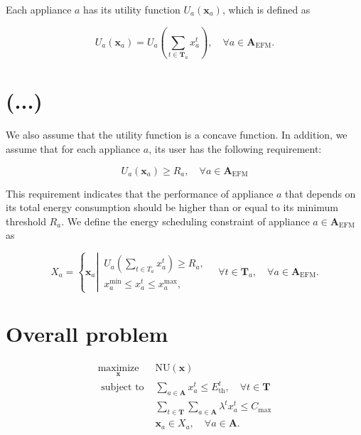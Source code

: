 \documentclass[10pt]{article}
\begin{document}
Each appliance $a$ has its utility function $U_{a}\left(\boldsymbol{x}_{a}\right)$, which is defined as


\begin{equation*}
U_{a}\left(\boldsymbol{x}_{a}\right)=U_{a}\left(\sum_{t \in \boldsymbol{T}_{a}} x_{a}^{t}\right), \quad \forall a \in \boldsymbol{A}_{\mathrm{EFM}} . \tag{11}
\end{equation*}


\section*{(...)}
We also assume that the utility function is a concave function. In addition, we assume that for each appliance $a$, its user has the following requirement:


\begin{equation*}
U_{a}\left(\boldsymbol{x}_{a}\right) \geq R_{a}, \quad \forall a \in \boldsymbol{A}_{\mathrm{EFM}} \tag{12}
\end{equation*}


This requirement indicates that the performance of appliance $a$ that depends on its total energy consumption should be higher than or equal to its minimum threshold $R_{a}$. We define the energy scheduling constraint of appliance $a \in \boldsymbol{A}_{\mathrm{EFM}}$ as

\[
X_{a}=\left\{\boldsymbol{x}_{a} \left\lvert\, \begin{array}{l}
U_{a}\left(\sum_{t \in T_{a}} x_{a}^{t}\right) \geq R_{a},  \tag{13}\\
x_{a}^{\min } \leq x_{a}^{t} \leq x_{a}^{\max },
\end{array} \quad \forall t \in \boldsymbol{T}_{a}\right., \quad \forall a \in \boldsymbol{A}_{\mathrm{EFM}} .\right.
\]

\section*{Overall problem}
\[
\begin{array}{ll}
\underset{\boldsymbol{x}}{\operatorname{maximize}} & \mathrm{NU}(\boldsymbol{x}) \\
\text { subject to } & \sum_{a \in \boldsymbol{A}} x_{a}^{t} \leq E_{\mathrm{th}}^{t}, \quad \forall t \in \boldsymbol{T} \\
& \sum_{t \in \boldsymbol{T}} \sum_{a \in \boldsymbol{A}} \lambda^{t} x_{a}^{t} \leq C_{\max } \\
& \boldsymbol{x}_{a} \in X_{a}, \quad \forall a \in \boldsymbol{A} . \tag{28}
\end{array}
\]
\end{document}
